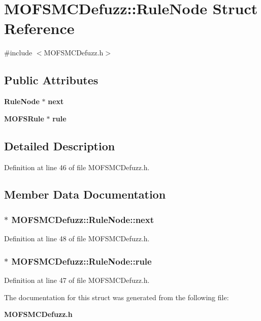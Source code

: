 \section{M\-O\-F\-S\-M\-C\-Defuzz\-:\-:Rule\-Node Struct Reference}
\label{structMOFSMCDefuzz_1_1RuleNode}


{\ttfamily \#include $<$M\-O\-F\-S\-M\-C\-Defuzz.\-h$>$}

\subsection*{Public Attributes}
\begin{DoxyCompactItemize}
\item 
{\bf Rule\-Node} $\ast$ {\bf next}
\item 
{\bf M\-O\-F\-S\-Rule} $\ast$ {\bf rule}
\end{DoxyCompactItemize}


\subsection{Detailed Description}


Definition at line 46 of file M\-O\-F\-S\-M\-C\-Defuzz.\-h.



\subsection{Member Data Documentation}
\subsubsection[{next}]{$\ast$ M\-O\-F\-S\-M\-C\-Defuzz\-::\-Rule\-Node\-::next}\label{structMOFSMCDefuzz_1_1RuleNode_a4b90a29c83048a3b2618d5b27d42d30d}


Definition at line 48 of file M\-O\-F\-S\-M\-C\-Defuzz.\-h.

\subsubsection[{rule}]{$\ast$ M\-O\-F\-S\-M\-C\-Defuzz\-::\-Rule\-Node\-::rule}\label{structMOFSMCDefuzz_1_1RuleNode_a5ad3d1659f0ae693f5ddaf8c27414605}


Definition at line 47 of file M\-O\-F\-S\-M\-C\-Defuzz.\-h.



The documentation for this struct was generated from the following file\-:\begin{DoxyCompactItemize}
\item 
{\bf M\-O\-F\-S\-M\-C\-Defuzz.\-h}\end{DoxyCompactItemize}
